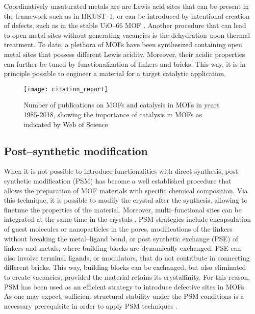 \npar
Coordinatively unsaturated metals are are Lewis acid sites that can be present in the framework such as in HKUST--1\cite{chui1999chemically}, or can be introduced by intentional creation of defects, such as in the stable UiO--66 MOF \cite{vandichel2015active}. Another procedure that can lead to open metal sites without generating vacancies is the dehydration upon thermal treatment. To date, a plethora of MOFs have been synthesized containing open metal sites that possess different Lewis acidity. Moreover, their acidic properties can further be tuned by functionalization of linkers and bricks. This way, it is in principle possible to engineer a material for a target catalytic application.

\begin{figure}[!htbp]
	\centering
 	\texttt{[image: citation\_report]}
	\caption{Number of publications on MOFs and catalysis in MOFs in years 1985-2018, showing the importance of catalysis in MOFs as indicated by Web of Science}
	\label{fig:citation_report}
\end{figure}
%
\subsection*{Post--synthetic modification}
When it is not possible to introduce functionalities with direct synthesis, post--synthetic modification (PSM) \cite{wang2009postsynthetic, cohen2011postsynthetic} has become a well established procedure that allows the preparation of MOF materials with specific chemical composition. Via this technique, it is possible to modify the crystal after the synthesis, allowing to finetune the properties of the material. Moreover, multi--functional sites can be integrated at the same time in the crystals \cite{li2016applications}. PSM strategies include encapsulation of guest molecules or nanoparticles in the pores, modifications of the linkers without breaking the metal--ligand bond, or post synthetic exchange (PSE) of linkers and metals, where building blocks are dynamically exchanged. PSE can also involve terminal ligands, or modulators, that do not contribute in connecting different bricks. This way, building blocks can be exchanged, but also eliminated to create vacancies, provided the material retains its crystallinity. For this reason, PSM has been used as an efficient strategy to introduce defective sites in MOFs. As one may expect, sufficient structural stability under the PSM conditions is a necessary prerequisite in order to apply PSM techniques \cite{garibay2010isoreticular}.
%

